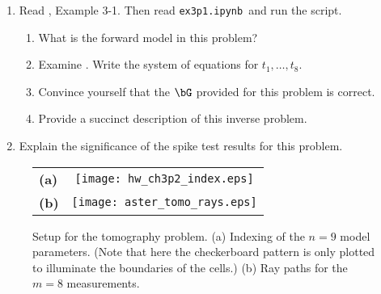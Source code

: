 \documentclass[11pt,titlepage,fleqn]{article}
\newcommand{\tfileB}{{\tt ex3p1.ipynb}}
\begin{document}
\begin{enumerate}
\item Read \citet{Aster}, Example 3-1. Then read \tfileB\ and run the script. 
%
\begin{enumerate}
\item What is the forward model in this problem?
\item Examine . Write the system of equations for $t_1, \ldots, t_8$.
\item Convince yourself that the $\bG$ provided for this problem is correct.
\item Provide a succinct description of this inverse problem.
\end{enumerate}

\item Explain the significance of the spike test results for this problem.

\end{enumerate}



\begin{figure}[h]
\centering
\begin{tabular}{lc}
{\bf(a)} & \texttt{[image: hw\_ch3p2\_index.eps]} \\
{\bf(b)} & \texttt{[image: aster\_tomo\_rays.eps]} \\
\end{tabular}
\caption[]
{{
Setup for the tomography problem.
(a) Indexing of the $n=9$ model parameters.
(Note that here the checkerboard pattern is only plotted to illuminate the boundaries of the cells.)
(b) Ray paths for the $m=8$ measurements.
\label{fig:index}
}}
\end{figure} 

\end{document}
